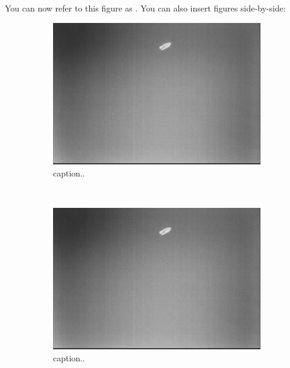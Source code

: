 You can now refer to this figure as . You can also insert figures side-by-side:
\begin{figure}[ht]
	\centering
	\begin{subfigure}[b]{0.45\textwidth}
		\includegraphics[width=\textwidth]{assignment_1/rapport/figures/fig1}
		\caption{caption..}
		\label{fig:2a}
	\end{subfigure}
	~ %
	\begin{subfigure}[b]{0.45\textwidth}
		\includegraphics[width=\textwidth]{assignment_1/rapport/figures/fig1}
		\caption{caption..}
		\label{fig:2b}
	\end{subfigure}
	\begin{subfigure}[b]{0.45\textwidth}

\end{subfigure}
\end{figure}
